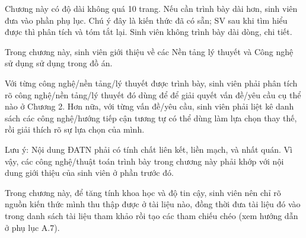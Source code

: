 \documentclass[../Main.tex]{subfiles}
\begin{document}
Chương này có độ dài không quá 10 trang. Nếu cần trình bày dài hơn, sinh viên đưa vào phần phụ lục. Chú ý đây là kiến thức đã có sẵn; SV sau khi tìm hiểu được thì phân tích và tóm tắt lại. Sinh viên không trình bày dài dòng, chi tiết. 

Trong chương này, sinh viên giới thiệu về các Nền tảng lý thuyết và Công nghệ sử dụng sử dụng trong đồ án.

Với từng công nghệ/nền tảng/lý thuyết được trình bày, sinh viên phải phân tích rõ công nghệ/nền tảng/lý thuyết đó dùng để để giải quyết vấn đề/yêu cầu cụ thể nào ở Chương 2. Hơn nữa, với từng vấn đề/yêu cầu, sinh viên phải liệt kê danh sách các công nghệ/hướng tiếp cận tương tự có thể dùng làm lựa chọn thay thế, rồi giải thích rõ sự lựa chọn của mình.

Lưu ý: Nội dung ĐATN phải có tính chất liên kết, liền mạch, và nhất quán. Vì vậy, các công nghệ/thuật toán trình bày trong chương này phải khớp với nội dung giới thiệu của sinh viên ở phần trước đó. 

Trong chương này, để tăng tính khoa học và độ tin cậy, sinh viên nên chỉ rõ nguồn kiến thức mình thu thập được ở tài liệu nào, đồng thời đưa tài liệu đó vào trong danh sách tài liệu tham khảo rồi tạo các tham chiếu chéo (xem hướng dẫn ở phụ lục A.7).
\end{document}
